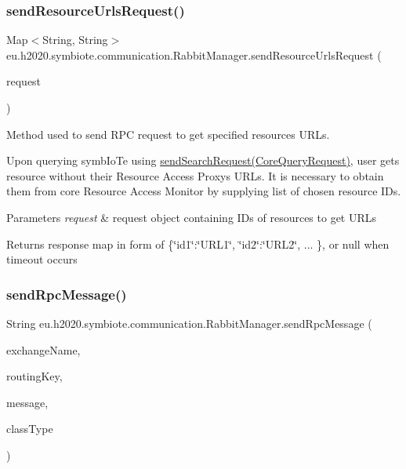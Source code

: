 \subsubsection{\texorpdfstring{send\+Resource\+Urls\+Request()}{sendResourceUrlsRequest()}}
{\footnotesize\ttfamily Map$<$String, String$>$ eu.\+h2020.\+symbiote.\+communication.\+Rabbit\+Manager.\+send\+Resource\+Urls\+Request (\begin{DoxyParamCaption}\item[{Resource\+Urls\+Request}]{request }\end{DoxyParamCaption})}

Method used to send R\+PC request to get specified resources U\+R\+Ls. 

Upon querying symb\+Io\+Te using \hyperlink{classeu_1_1h2020_1_1symbiote_1_1communication_1_1RabbitManager_a5b92c55b2c12067f60f030f6fdabb685}{send\+Search\+Request(\+Core\+Query\+Request)}, user gets resource without their Resource Access Proxy\textquotesingle{}s U\+R\+Ls. It is necessary to obtain them from core Resource Access Monitor by supplying list of chosen resource I\+Ds.


\begin{DoxyParams}{Parameters}
{\em request} & request object containing I\+Ds of resources to get U\+R\+Ls \\
\hline
\end{DoxyParams}
\begin{DoxyReturn}{Returns}
response map in form of \{\char`\"{}id1\char`\"{}\+:\char`\"{}\+U\+R\+L1\char`\"{}, \char`\"{}id2\char`\"{}\+:\char`\"{}\+U\+R\+L2\char`\"{}, ... \}, or null when timeout occurs 
\end{DoxyReturn}
\mbox{\label{classeu_1_1h2020_1_1symbiote_1_1communication_1_1RabbitManager_a9c71bf18d0bf371fd35c977a69861855}} 
\subsubsection{\texorpdfstring{send\+Rpc\+Message()}{sendRpcMessage()}}
{\footnotesize\ttfamily String eu.\+h2020.\+symbiote.\+communication.\+Rabbit\+Manager.\+send\+Rpc\+Message (\begin{DoxyParamCaption}\item[{String}]{exchange\+Name,  }\item[{String}]{routing\+Key,  }\item[{String}]{message,  }\item[{String}]{class\+Type }\end{DoxyParamCaption})}

